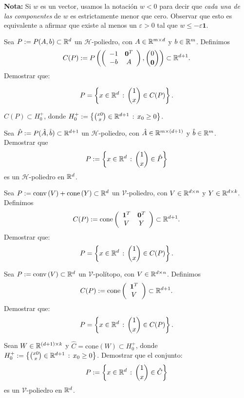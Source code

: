 \documentclass[a4paper,12pt]{article}
\newcommand{\colvector}[2]{{#1 \choose #2}}
\renewcommand{\conv}[1]{\mathrm{conv}\left(#1\right)}
\renewcommand{\cone}[1]{\mathrm{cone}\left(#1\right)}
\newcommand{\HH}{\mathcal{H}}
\newcommand{\VV}{\mathcal{V}}
\begin{document}
\begin{exerciselist}
  \textbf{Nota:} Si $w$ es un vector, usamos la notación $w < 0$ para decir que \emph{cada una de las componentes} de $w$ es estrictamente menor que cero. Observar que esto es equivalente a afirmar que existe al menos un $\varepsilon > 0$  tal que $w \leq - \varepsilon \mathbf{1}$.

  \item Sea $P:=P(A,b) \subset \mathbb{R}^d$ un $\HH$-poliedro, con $A \in \mathbb{R}^{m \times d}$ y $b \in \mathbb{R}^m$. Definimos
  $$
  C(P):= P\left(
  \left(
  \begin{array}{cc}
    -1 & \zero^T \\
    -b & A \\
  \end{array}
  \right),
  \colvector{0}{\zero}
  \right) \subset \RR^{d+1}.
  $$
  Demostrar que:
  \begin{exerciselist}
  \item $$
  P = \setof{x \in \RR^d}{\colvector{1}{x} \in C(P)}.
  $$
  \item $C(P) \subset H_0^{+}$, donde $H_0^{+} := \setof{\colvector{x0}{x} \in \RR^{d+1}}{x_0 \geq 0}$.
  \end{exerciselist}
  

  \item Sea $\hat{P}:=P(\hat{A},\hat{b}) \subset \mathbb{R}^{d+1}$ un $\HH$-poliedro, con $\hat{A} \in \mathbb{R}^{m \times (d+1)}$ y $\hat{b} \in \mathbb{R}^m$. Demostrar que
  $$
  P := \setof{x \in \RR^d}{\colvector{1}{x} \in \hat{P}}
  $$
  es un $\HH$-poliedro en $\mathbb{R}^d$.

  \item Sea $P:=\conv{V} + \cone{Y} \subset \RR^d$ un $\VV$-poliedro, con $V \in \mathbb{R}^{d \times n}$ y $Y \in \mathbb{R}^{d \times k}$. Definimos
  $$
  C(P):= \cone{
  \begin{array}{cc}
    \one^T & \zero^T \\
    V & Y
  \end{array}
  } \subset \RR^{d+1}.
  $$
  Demostrar que:
  $$
  P = \setof{x \in \RR^d}{\colvector{1}{x} \in C(P)}.
  $$

  \item Sea $P:=\conv{V} \subset \RR^d$ un $\VV$-polítopo, con $V \in \mathbb{R}^{d \times n}$. Definimos
  $$
  C(P):= \cone{
  \begin{array}{cc}
    \one^T \\ V
  \end{array}
  } \subset \RR^{d+1}.
  $$
  Demostrar que:
  $$
  P = \setof{x \in \RR^d}{\colvector{1}{x} \in C(P)}.
  $$

  \item Sean $W \in \mathbb{R}^{(d+1) \times k}$ y $\hat{C} = \mathrm{cone}(W) \subset
  H_0^{+}$, donde $H_0^{+} := \setof{\colvector{x0}{x} \in \RR^{d+1}}{x_0 \geq 0}$. 
  Demostrar que el conjunto:
  $$
  P := \left\{ x \in \mathbb{R}^d \, : \, {1 \choose x} \in \hat{C} \right\}
  $$
  es un $\mathcal{V}$-poliedro en $\mathbb{R}^d$.


\end{exerciselist}
\end{document}
